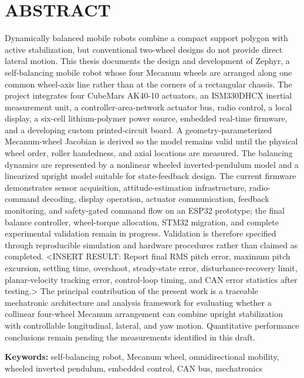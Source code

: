\chapter*{ABSTRACT}
\begin{center}
\textbf{\ThesisTitle}\par
\ThesisAuthor
\end{center}

Dynamically balanced mobile robots combine a compact support polygon with active stabilization, but conventional two-wheel designs do not provide direct lateral motion. This thesis documents the design and development of Zephyr, a self-balancing mobile robot whose four Mecanum wheels are arranged along one common wheel-axis line rather than at the corners of a rectangular chassis. The project integrates four CubeMars AK40-10 actuators, an ISM330DHCX inertial measurement unit, a controller-area-network actuator bus, radio control, a local display, a six-cell lithium-polymer power source, embedded real-time firmware, and a developing custom printed-circuit board. A geometry-parameterized Mecanum-wheel Jacobian is derived so the model remains valid until the physical wheel order, roller handedness, and axial locations are measured. The balancing dynamics are represented by a nonlinear wheeled inverted-pendulum model and a linearized upright model suitable for state-feedback design. The current firmware demonstrates sensor acquisition, attitude-estimation infrastructure, radio-command decoding, display operation, actuator communication, feedback monitoring, and safety-gated command flow on an ESP32 prototype; the final balance controller, wheel-torque allocation, STM32 migration, and complete experimental validation remain in progress. Validation is therefore specified through reproducible simulation and hardware procedures rather than claimed as completed. \textless INSERT RESULT: Report final RMS pitch error, maximum pitch excursion, settling time, overshoot, steady-state error, disturbance-recovery limit, planar-velocity tracking error, control-loop timing, and CAN error statistics after testing.\textgreater{} The principal contribution of the present work is a traceable mechatronic architecture and analysis framework for evaluating whether a collinear four-wheel Mecanum arrangement can combine upright stabilization with controllable longitudinal, lateral, and yaw motion. Quantitative performance conclusions remain pending the measurements identified in this draft.

\noindent\textbf{Keywords:} self-balancing robot, Mecanum wheel, omnidirectional mobility, wheeled inverted pendulum, embedded control, CAN bus, mechatronics
\clearpage
